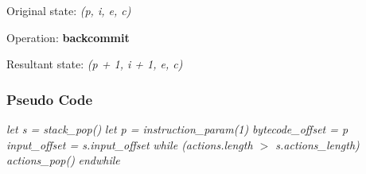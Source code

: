 Original state: \textit{(p, i, e, c)}
  
Operation: \textbf{backcommit}

Resultant state: \textit{(p + 1, i + 1, e, c)}

\subsubsection{Pseudo Code}

\begin{myquote}
\textit{let s = stack\_pop()}                          \newline
\textit{let p = instruction\_param(1)}                 \newline
\textit{bytecode\_offset = p}                          \newline
\textit{input\_offset = s.input\_offset}               \newline
\textit{while (actions.length $>$ s.actions\_length)}  \newline
\hspace*{10mm} \textit{actions\_pop()}                 \newline
\textit{endwhile}
\end{myquote}
